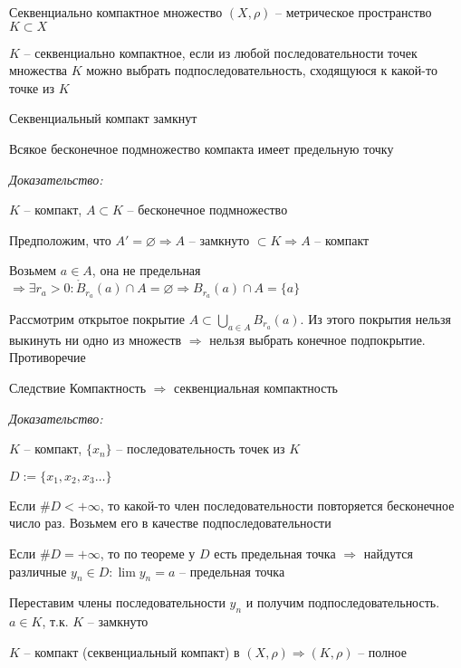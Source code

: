\documentclass[12pt]{article}
\begin{document}
\begin{defin}{Секвенциально компактное множество}
    $(X, \rho)$ -- метрическое пространство $K \subset X$

    $K$ -- секвенциально компактное, если из любой последовательности точек множества $K$ можно выбрать подпоследовательность, сходящуюся к какой-то точке из $K$
\end{defin}

\begin{Remark}{}
    Секвенциальный компакт замкнут 
\end{Remark}

\begin{theo}{}
    Всякое бесконечное подмножество компакта имеет предельную точку
\end{theo}

\textit{Доказательство:}

$K$ -- компакт, $A \subset K$ -- бесконечное подмножество

Предположим, что $A' = \varnothing \Rightarrow A$ -- замкнуто $\subset K \Rightarrow A$ -- компакт 

Возьмем $a \in A$, она не предельная $\Rightarrow \exists r_a > 0 : \mathring{B}_{r_a}(a) \cap A = \varnothing \Rightarrow B_{r_a}(a) \cap A = \{a\}$

Рассмотрим открытое покрытие $A \subset \bigcup\limits_{a \in A} B_{r_a}(a)$. Из этого покрытия нельзя выкинуть ни одно из множеств $\Rightarrow$ нельзя выбрать конечное подпокрытие. Противоречие 

\begin{theo}{Следствие}
    Компактность $\Rightarrow$ секвенциальная компактность
\end{theo}

\textit{Доказательство:}

$K$ -- компакт, $\{x_n\}$ -- последовательность точек из $K$

$D := \{x_1, x_2, x_3 \ldots\}$

Если $\#D < + \infty$, то какой-то член последовательности повторяется бесконечное число раз. Возьмем его в качестве подпоследовательности

Если $\#D = + \infty$, то по теореме у $D$ есть предельная точка $\Rightarrow$ найдутся различные $y_n \in D : \lim y_n = a$ -- предельная точка 

Переставим члены последовательности $y_n$ и получим подпоследовательность. $a \in K$, т.к. $K$ -- замкнуто

\begin{theo}{}
    $K$ -- компакт (секвенциальный компакт) в $(X, \rho) \Rightarrow (K, \rho)$ -- полное
\end{theo}
\end{document}
